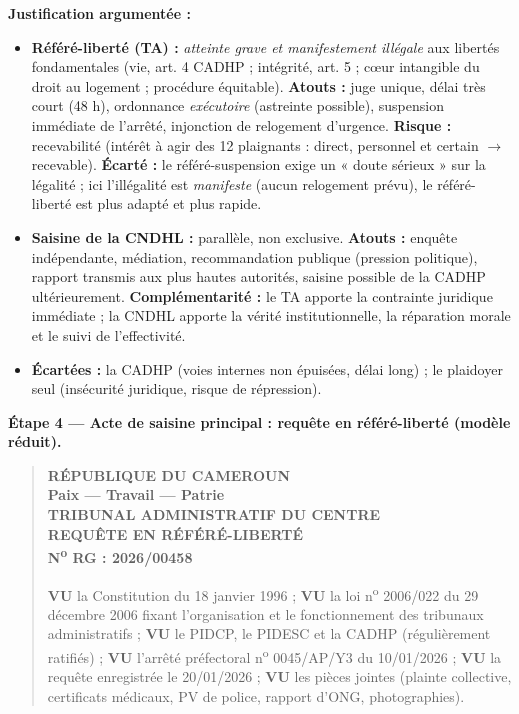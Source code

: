 \documentclass[11pt]{article}
\begin{document}
\begin{exoresolu}
\textbf{Justification argumentée :}
\begin{itemize}
    \item \textbf{Référé-liberté (TA) :} \emph{atteinte grave et manifestement illégale} aux libertés fondamentales (vie, art. 4 CADHP ; intégrité, art. 5 ; cœur intangible du droit au logement ; procédure équitable). \textbf{Atouts :} juge unique, délai très court (48 h), ordonnance \emph{exécutoire} (astreinte possible), suspension immédiate de l'arrêté, injonction de relogement d'urgence. \textbf{Risque :} recevabilité (intérêt à agir des 12 plaignants : direct, personnel et certain $\rightarrow$ recevable). \textbf{Écarté :} le référé-suspension exige un « doute sérieux » sur la légalité ; ici l'illégalité est \emph{manifeste} (aucun relogement prévu), le référé-liberté est plus adapté et plus rapide.
    \item \textbf{Saisine de la CNDHL :} parallèle, non exclusive. \textbf{Atouts :} enquête indépendante, médiation, recommandation publique (pression politique), rapport transmis aux plus hautes autorités, saisine possible de la CADHP ultérieurement. \textbf{Complémentarité :} le TA apporte la contrainte juridique immédiate ; la CNDHL apporte la vérité institutionnelle, la réparation morale et le suivi de l'effectivité.
    \item \textbf{Écartées :} la CADHP (voies internes non épuisées, délai long) ; le plaidoyer seul (insécurité juridique, risque de répression).
\end{itemize}

\vspace{0.5cm}
\textbf{Étape 4 — Acte de saisine principal : requête en référé-liberté (modèle réduit).}

\begin{quote}
\small
\textbf{RÉPUBLIQUE DU CAMEROUN}\\
\textbf{Paix — Travail — Patrie}\\
\textbf{TRIBUNAL ADMINISTRATIF DU CENTRE}\\
\textbf{REQUÊTE EN RÉFÉRÉ-LIBERTÉ}\\
\textbf{N\textsuperscript{o} RG : 2026/00458}\\\vspace{0.2cm}

\textbf{VU} la Constitution du 18 janvier 1996 ; \textbf{VU} la loi n\textsuperscript{o} 2006/022 du 29 décembre 2006 fixant l'organisation et le fonctionnement des tribunaux administratifs ; \textbf{VU} le PIDCP, le PIDESC et la CADHP (régulièrement ratifiés) ; \textbf{VU} l'arrêté préfectoral n\textsuperscript{o} 0045/AP/Y3 du 10/01/2026 ; \textbf{VU} la requête enregistrée le 20/01/2026 ; \textbf{VU} les pièces jointes (plainte collective, certificats médicaux, PV de police, rapport d'ONG, photographies).\\\vspace{0.2cm}


\end{quote}
\end{exoresolu}
\end{document}

